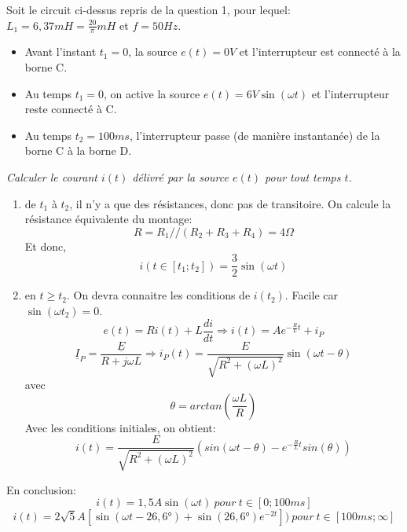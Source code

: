 Soit le circuit ci-dessus repris de la question 1, pour lequel: $L_1=6,37mH=\frac{20}{\pi}mH$ et  $f=50Hz$.
\begin{itemize}
	\item Avant l'instant $t_1=0$, la source $e(t)=0V$ et l'interrupteur est connecté à la borne C.
	\item Au temps $t_1=0$, on active la source $e(t)=6V \sin(\omega t)$ et l'interrupteur reste connecté à C.
	\item Au temps $t_2=100ms$, l'interrupteur passe (de manière instantanée) de la borne C à la borne D.
\end{itemize}
\vspace{3mm}

\Question
{
\textit{Calculer le courant $i(t)$ délivré par la source $e(t)$ pour tout temps $t$.}
}
{%
\begin{enumerate}
\item de $t_1$ à $t_2$, il n'y a que des résistances, donc pas de transitoire. On calcule la résistance équivalente du montage:
$$R=R_1//(R_2+R_3+R_4)=4\Omega$$
Et donc,
$$i(t\in[t_1;t_2])=\frac{3}{2}\sin(\omega t)$$
\item en $t\geq t_2$. On devra connaitre les conditions de $i(t_2)$. Facile car $\sin(\omega t_2)=0$.
$$e(t)=Ri(t)+L\frac{di}{dt} \Rightarrow i(t) = Ae^{-\frac{R}{L}t}+i_P$$
$$\underline{I}_P=\frac{\underline{E}}{R+j\omega L}\Rightarrow i_P(t)=\frac{E}{\sqrt{R^2+(\omega L)^2}} \sin(\omega t - \theta)$$
avec $$\theta=arctan(\frac{\omega L}{R})$$
Avec les conditions initiales, on obtient:
$$i(t) = \frac{E}{\sqrt{R^2+(\omega L)^2}}(sin(\omega t-\theta)-e^{-\frac{R}{L}t}sin(\theta))$$
\end{enumerate}

En conclusion:
$$i(t)=1,5A\sin(\omega t)\ pour\ t\in[0;100ms]$$
$$i(t)=2\sqrt{5}A[\sin(\omega t-26,6°)+\sin(26,6°)e^{-2t}])\ pour\ t\in[100ms;\infty]$$
}

